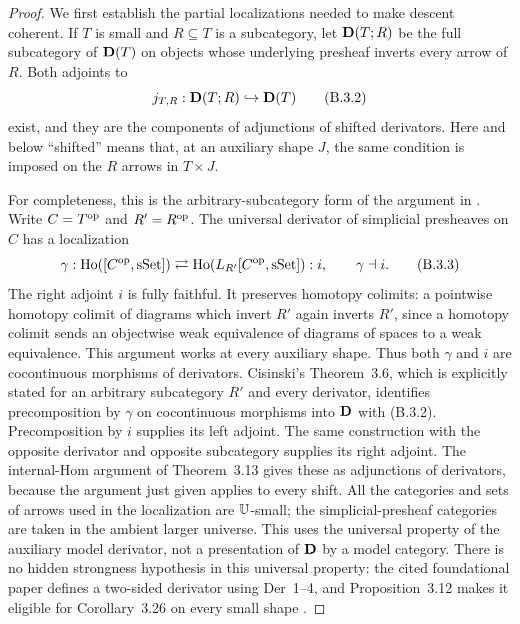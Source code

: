 \begin{proof}
We first establish the partial localizations needed to make descent
coherent. If $T$ is small and $R\subseteq T$ is a subcategory, let
$\mathbf D(T;R)$ be the full subcategory of $\mathbf D(T)$ on objects whose
underlying presheaf inverts every arrow of $R$. Both adjoints to
\[
 j_{T,R}:\mathbf D(T;R)\hookrightarrow\mathbf D(T)
 \tag{B.3.2}
\]
exist, and they are the components of adjunctions of shifted
derivators. Here and below ``shifted'' means that, at an auxiliary
shape $J$, the same condition is imposed on the $R$ arrows in
$T\times J$.

For completeness, this is the arbitrary-subcategory form of the
argument in \citet[Theorem~3.6, Lemma~3.9, Proposition~3.10, and
Theorem~3.13]{Cisinski2009LocallyConstant}. Write $C=T^{\mathrm{op}}$ and
$R'=R^{\mathrm{op}}$. The universal derivator of simplicial presheaves on
$C$ has a localization
\[
 \gamma:\operatorname{Ho}([C^{\mathrm{op}},\mathrm{sSet}])
 \rightleftarrows
 \operatorname{Ho}(L_{R'}[C^{\mathrm{op}},\mathrm{sSet}]):i,
 \qquad\gamma\dashv i.
 \tag{B.3.3}
\]
The right adjoint $i$ is fully faithful. It preserves homotopy
colimits: a pointwise homotopy colimit of diagrams which invert
$R'$ again inverts $R'$, since a homotopy colimit sends an
objectwise weak equivalence of diagrams of spaces to a weak
equivalence. This argument works at every auxiliary shape. Thus both
$\gamma$ and $i$ are cocontinuous morphisms of derivators.
Cisinski's Theorem~3.6, which is explicitly stated for an arbitrary
subcategory $R'$ and every derivator, identifies precomposition by
$\gamma$ on cocontinuous morphisms into $\mathbf D$ with (B.3.2).
Precomposition by $i$ supplies its left adjoint. The same construction
with the opposite derivator and opposite subcategory supplies its
right adjoint. The internal-Hom argument of Theorem~3.13 gives these
as adjunctions of derivators, because the argument just given applies
to every shift. All the categories and sets of arrows used in the
localization are $\mathbb U$-small; the simplicial-presheaf categories are
taken in the ambient larger universe. This uses the universal
property of the auxiliary model derivator, not a presentation of
$\mathbf D$ by a model category.
There is no hidden strongness hypothesis in this universal property:
the cited foundational paper defines a two-sided derivator using
Der~1--4, and Proposition~3.12 makes it eligible for Corollary~3.26
on every small shape
\citep[Definitions~0.1--0.2, Proposition~3.12, and
Corollary~3.26]{Cisinski2008}.


\end{proof}
